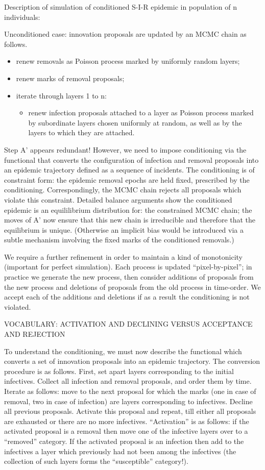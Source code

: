 \documentclass{article}
\begin{document}
Description of simulation of conditioned S-I-R epidemic in population
of n individuals:

Unconditioned case: innovation proposals are updated by an MCMC chain
as follows.
\begin{itemize}
\item[A:] renew removals as Poisson process marked by uniformly random
  layers;
\item[A':] renew marks of removal proposals;
\item[B1-n:] iterate through layers 1 to n:
  \begin{itemize}
  \item renew infection proposals attached to a layer as Poisson
    process marked by subordinate layers chosen uniformly at random,
    as well as by the layers to which they are attached.
\end{itemize}
\end{itemize}

Step A' appears redundant! However, we need to impose conditioning via
the functional that converts the configuration of infection and
removal proposals into an epidemic trajectory defined as a sequence of
incidents. The conditioning is of constraint form: the epidemic
removal epochs are held fixed, prescribed by the conditioning.
Correspondingly, the MCMC chain rejects all proposals which violate
this constraint. Detailed balance arguments show the conditioned
epidemic is an equililibrium distribution for: the constrained MCMC
chain; the moves of A' now ensure that this new chain is irreducible
and therefore that the equilibrium is unique. (Otherwise an implicit
bias would be introduced via a subtle mechanism involving the fixed
marks of the conditioned removals.)

We require a further refinement in order to maintain a kind of
monotonicity (important for perfect simulation). Each process is
updated ``pixel-by-pixel''; in practice we generate the new process,
then consider additions of proposals from the new process and
deletions of proposals from the old process in time-order. We accept
each of the additions and deletions if as a result the conditioning is
not violated.
 
VOCABULARY: ACTIVATION AND  DECLINING  VERSUS ACCEPTANCE AND REJECTION 

To understand the conditioning, we must now describe the functional
which converts a set of innovation proposals into an epidemic
trajectory. The conversion procedure is as follows. First, set apart
layers corresponding to the initial infectives. Collect all infection
and removal proposals, and order them by time. Iterate as follows:
move to the next proposal for which the marks (one in case of removal,
two in case of infection) are layers corresponding to infectives.
Decline all previous proposals. Activate this proposal and repeat,
till either all proposals are exhausted or there are no more
infectives. ``Activation'' is as follows: if the activated proposal is a
removal then move one of the infective layers over to a ``removed''
category. If the activated proposal is an infection then add to the
infectives a layer which previously had not been among the infectives
(the collection of such layers forms the ``susceptible'' category!).
\end{document}
